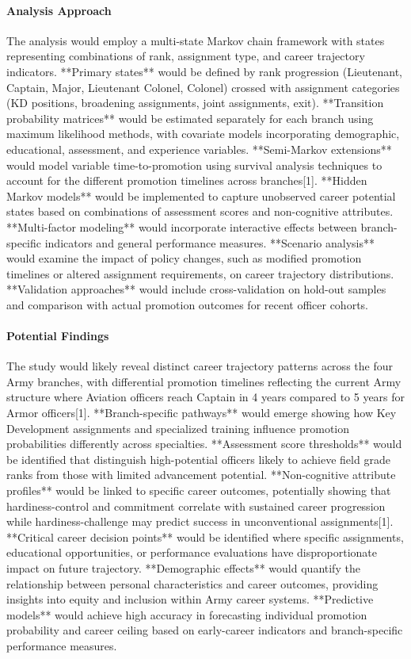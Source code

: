 \documentclass[main.tex]{subfiles}
\begin{document}
\paragraph{Analysis Approach}

The analysis would employ a multi-state Markov chain framework with states representing combinations of rank, assignment type, and career trajectory indicators. **Primary states** would be defined by rank progression (Lieutenant, Captain, Major, Lieutenant Colonel, Colonel) crossed with assignment categories (KD positions, broadening assignments, joint assignments, exit). **Transition probability matrices** would be estimated separately for each branch using maximum likelihood methods, with covariate models incorporating demographic, educational, assessment, and experience variables. **Semi-Markov extensions** would model variable time-to-promotion using survival analysis techniques to account for the different promotion timelines across branches[1]. **Hidden Markov models** would be implemented to capture unobserved career potential states based on combinations of assessment scores and non-cognitive attributes. **Multi-factor modeling** would incorporate interactive effects between branch-specific indicators and general performance measures. **Scenario analysis** would examine the impact of policy changes, such as modified promotion timelines or altered assignment requirements, on career trajectory distributions. **Validation approaches** would include cross-validation on hold-out samples and comparison with actual promotion outcomes for recent officer cohorts.

\paragraph{Potential Findings}

The study would likely reveal distinct career trajectory patterns across the four Army branches, with differential promotion timelines reflecting the current Army structure where Aviation officers reach Captain in 4 years compared to 5 years for Armor officers[1]. **Branch-specific pathways** would emerge showing how Key Development assignments and specialized training influence promotion probabilities differently across specialties. **Assessment score thresholds** would be identified that distinguish high-potential officers likely to achieve field grade ranks from those with limited advancement potential. **Non-cognitive attribute profiles** would be linked to specific career outcomes, potentially showing that hardiness-control and commitment correlate with sustained career progression while hardiness-challenge may predict success in unconventional assignments[1]. **Critical career decision points** would be identified where specific assignments, educational opportunities, or performance evaluations have disproportionate impact on future trajectory. **Demographic effects** would quantify the relationship between personal characteristics and career outcomes, providing insights into equity and inclusion within Army career systems. **Predictive models** would achieve high accuracy in forecasting individual promotion probability and career ceiling based on early-career indicators and branch-specific performance measures.
\end{document}
